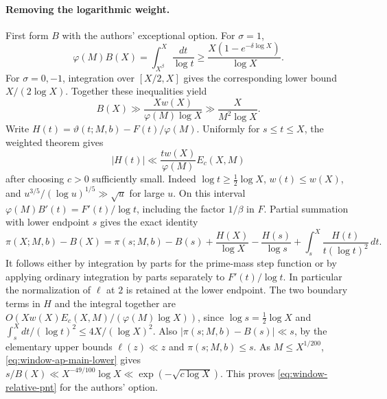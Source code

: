 \paragraph{Removing the logarithmic weight.}
First form \(B\) with the authors' exceptional option.
For \(\sigma=1\),
\[
  \varphi(M) B(X)=\int_{X^\beta}^{X}\frac{dt}{\log t}
     \ge \frac{X(1-e^{-\delta\log X})}{\log X}.
\]
For \(\sigma=0,-1\), integration over \([X/2,X]\)
gives the corresponding lower bound \(X/(2\log X)\).
Together these inequalities yield
\begin{equation}
 B(X)\gg \frac{X w(X)}{\varphi(M)\log X}
          \gg\frac{X}{M^2\log X}.
 \label{eq:window-ap-main-lower}
\end{equation}
Write \(H(t)=\vartheta(t;M,b)-F(t)/\varphi(M)\).
Uniformly for \(s\le t\le X\), the weighted theorem gives
\[
 |H(t)|\ll \frac{t w(X)}{\varphi(M)} E_c(X,M)
\]
after choosing \(c>0\) sufficiently small. Indeed
\(\log t\ge\tfrac12\log X\), \(w(t)\le w(X)\), and
\(u^{3/5}/(\log u)^{1/5}\gg\sqrt u\) for large \(u\).
On this interval \(\varphi(M)B'(t)=F'(t)/\log t\), including the
factor \(1/\beta\) in \(F\). Partial summation with lower endpoint
\(s\) gives the exact identity
\[
 \pi(X;M,b)-B(X)=\pi(s;M,b)-B(s)
   +\frac{H(X)}{\log X}-\frac{H(s)}{\log s}
   +\int_s^X\frac{H(t)}{t(\log t)^2}\,dt.
\]
It follows either by integration by parts for the prime-mass step
function or by applying ordinary integration by parts separately to
\(F'(t)/\log t\). In particular the normalization of \(\ell\) at
\(2\) is retained at the lower endpoint. The two boundary terms
in \(H\) and the integral together are
\(O(X w(X) E_c(X,M)/(\varphi(M)\log X))\), since
\(\log s=\tfrac12\log X\) and
\(\int_s^Xdt/(\log t)^2\le4X/(\log X)^2\).
Also \(|\pi(s;M,b)-B(s)|\ll s\), by the elementary upper bounds
\(\ell(z)\ll z\) and \(\pi(s;M,b)\le s\).
As \(M\le X^{1/200}\), \eqref{eq:window-ap-main-lower} gives
\(s/B(X)\ll X^{-49/100}\log X\ll\exp(-\sqrt{c\log X})\).
This proves \eqref{eq:window-relative-pnt} for the authors' option.

